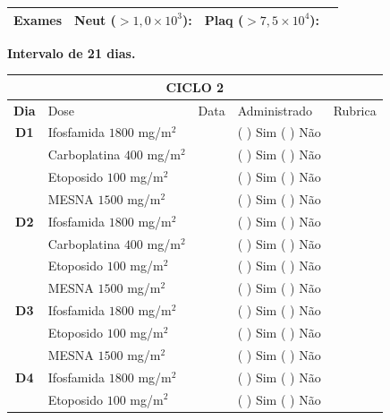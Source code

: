 \documentclass[11pt,a4paper,oldfontcommands]{memoir}
\begin{document}
\begin{center}
\begin{longtable}{p{1cm}p{4cm}|p{1cm}|p{3cm}|p{2.9cm}}
    \hline
    \multicolumn{1}{c|}{\multirow{1}{*}{\textbf{Exames}}}&\multicolumn{2}{l|}{Neut (\(>1,0\times10^3\)):}&{Plaq (\(>7,5\times10^4\)):}&{}\\
    \hline
\end{longtable}
\textbf{Intervalo de 21 dias.}
\end{center}

\begin{center}
\begin{longtable}{p{1cm}p{4cm}|p{1cm}|p{3cm}|p{2.9cm}}
	\hline
	\multicolumn{5}{c}{\textbf{CICLO 2}}\\
\hline
    \multicolumn{1}{c|}{\multirow{1}{*}{\textbf{Dia}}}&{Dose}&{Data}&{Administrado}&{Rubrica} \\
    \hline
    \multicolumn{1}{c|}{\multirow{1}{*}{\textbf{D1}}}&{Ifosfamida \(1800\) mg/m\(^2\)}&&{(  ) Sim (  ) Não}&\\
    \multicolumn{1}{c|}{\multirow{1}{*}{\textbf{}}}&{Carboplatina \(400\) mg/m\(^2\)}&&{(  ) Sim (  ) Não}&\\
    \multicolumn{1}{c|}{\multirow{1}{*}{\textbf{}}}&{Etoposido \(100\) mg/m\(^2\)}&&{(  ) Sim (  ) Não}&\\
    \multicolumn{1}{c|}{\multirow{1}{*}{\textbf{}}}&{MESNA \(1500\) mg/m\(^2\)}&&{(  ) Sim (  ) Não}&\\
    \multicolumn{1}{c|}{\multirow{1}{*}{\textbf{D2}}}&{Ifosfamida \(1800\) mg/m\(^2\)}&&{(  ) Sim (  ) Não}&\\
    \multicolumn{1}{c|}{\multirow{1}{*}{\textbf{}}}&{Carboplatina \(400\) mg/m\(^2\)}&&{(  ) Sim (  ) Não}&\\
    \multicolumn{1}{c|}{\multirow{1}{*}{\textbf{}}}&{Etoposido \(100\) mg/m\(^2\)}&&{(  ) Sim (  ) Não}&\\
    \multicolumn{1}{c|}{\multirow{1}{*}{\textbf{}}}&{MESNA \(1500\) mg/m\(^2\)}&&{(  ) Sim (  ) Não}&\\
    \multicolumn{1}{c|}{\multirow{1}{*}{\textbf{D3}}}&{Ifosfamida \(1800\) mg/m\(^2\)}&&{(  ) Sim (  ) Não}&\\
    \multicolumn{1}{c|}{\multirow{1}{*}{\textbf{}}}&{Etoposido \(100\) mg/m\(^2\)}&&{(  ) Sim (  ) Não}&\\
    \multicolumn{1}{c|}{\multirow{1}{*}{\textbf{}}}&{MESNA \(1500\) mg/m\(^2\)}&&{(  ) Sim (  ) Não}&\\
    \multicolumn{1}{c|}{\multirow{1}{*}{\textbf{D4}}}&{Ifosfamida \(1800\) mg/m\(^2\)}&&{(  ) Sim (  ) Não}&\\
    \multicolumn{1}{c|}{\multirow{1}{*}{\textbf{}}}&{Etoposido \(100\) mg/m\(^2\)}&&{(  ) Sim (  ) Não}&\\

\end{longtable}
\end{center}
\end{document}
